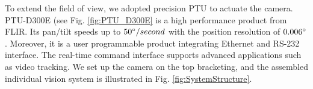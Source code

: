 To extend the field of view, we adopted precision PTU to actuate the camera. PTU-D300E (see Fig. \ref{fig:PTU_D300E} is a high performance product from FLIR. Its pan/tilt speeds up to $50\degree/second$ with the position resolution of $0.006\degree$. Moreover, it is a user programmable product integrating Ethernet  and RS-232 interface. The real-time command interface supports advanced applications such as video tracking. We set up the camera on the top bracketing, and the assembled individual vision system is illustrated in Fig. \ref{fig:SystemStructure}. 




